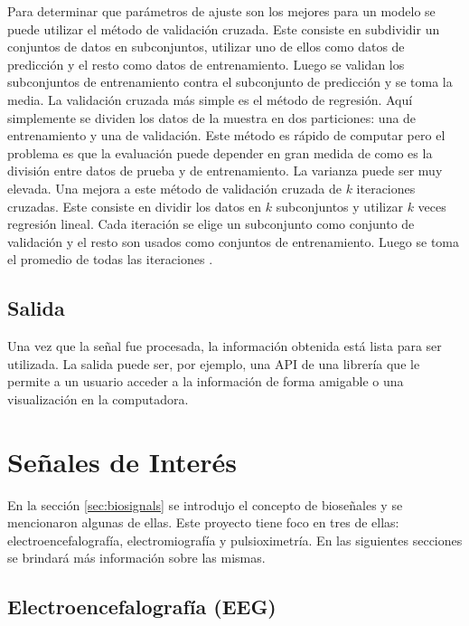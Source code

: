 Para determinar que parámetros de ajuste son los mejores para un modelo se puede utilizar el método de validación cruzada. Este consiste en subdividir un conjuntos de datos en subconjuntos, utilizar uno de ellos como datos de predicción y el resto como datos de entrenamiento. Luego se validan los subconjuntos de entrenamiento contra el subconjunto de predicción y se toma la media. La validación cruzada más simple es el método de regresión. Aquí simplemente se dividen los datos de la muestra en dos particiones: una de entrenamiento y una de validación. Este método es rápido de computar pero el problema es que la evaluación puede depender en gran medida de como es la división entre datos de prueba y de entrenamiento. La varianza puede ser muy elevada. Una mejora a este método de validación cruzada de $k$ iteraciones cruzadas. Este consiste en dividir los datos en $k$ subconjuntos y utilizar   $k$ veces regresión lineal. Cada iteración se elige un subconjunto como conjunto de validación y el resto son usados como conjuntos de entrenamiento. Luego se toma el promedio de todas las iteraciones \cite{cross-validation}.

\subsection{Salida}

Una vez que la señal fue procesada, la información obtenida está lista para ser utilizada. La salida puede ser, por ejemplo, una API de una librería que le permite a un usuario acceder a la información de forma amigable o una visualización en la computadora.

\section{Señales de Interés}

En la sección \ref{sec:biosignals} se introdujo el concepto de bioseñales y se mencionaron algunas de ellas. Este proyecto tiene foco en tres de ellas: 
electroencefalografía, electromiografía y pulsioximetría. En las siguientes secciones se brindará más información sobre las mismas.

\subsection{Electroencefalografía (EEG)}

